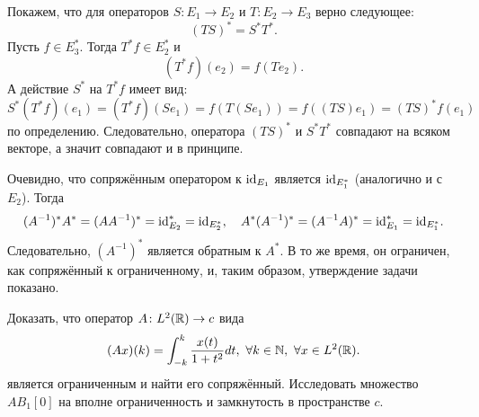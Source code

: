 \begin{solution}
    Покажем, что для операторов $S\colon E_1 \to E_2$ и $T\colon E_2 \to E_3$ верно следующее:
    \[
        (TS)^* = S^* T^*.
    \]
    Пусть $f \in E_3^*$.
    Тогда $T^* f \in E_2^*$ и
    \[
        (T^* f)(e_2) = f(Te_2).
    \]
    А действие $S^*$ на $T^* f$ имеет вид:
    \[
        S^*(T^* f)(e_1) = (T^* f)(S e_1) = f(T(S e_1)) = f((TS) e_1) = (TS)^{*}f(e_1)
    \]
    по определению.
    Следовательно, оператора $(TS)^*$ и $S^* T^*$ совпадают на всяком векторе, а значит совпадают и в принципе.

    Очевидно, что сопряжённым оператором к $\mathrm{id}_{E_1}$ является $\mathrm{id}_{E_1^*}$ (аналогично и с $E_2$).
    Тогда
    \[
        (A^{-1})^* A^* = (AA^{-1})^* = \mathrm{id}_{E_2}^* = \mathrm{id}_{E_2^*}, \quad A^* (A^{-1})^* = (A^{-1}A)^* = \mathrm{id}_{E_1}^* = \mathrm{id}_{E_1^*}.
    \]
    Следовательно, $(A^{-1})^*$ является обратным к $A^*$.
    В то же время, он ограничен, как сопряжённый к ограниченному, и, таким образом, утверждение задачи показано.
\end{solution}
\begin{task}[T15]
    Доказать, что оператор $A\colon L^2(\mathbb{R}) \to c$ вида
    \[
        (Ax)(k) = \int_{-k}^{k} \frac{x(t)}{1 + t^2}dt, \ \forall k \in \mathbb{N}, \ \forall x \in L^2(\mathbb{R}).
    \]
    является ограниченным и найти его сопряжённый.
    Исследовать множество $AB_1[0]$ на вполне ограниченность и замкнутость в пространстве $c$.
\end{task}
